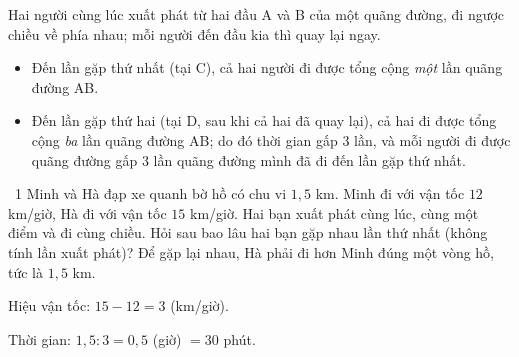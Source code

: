 \gap
{}
\begin{knowbox}
Hai người cùng lúc xuất phát từ hai đầu A và B của một quãng đường, đi ngược chiều về phía nhau; mỗi người đến đầu kia thì quay lại ngay.
\begin{center}
\end{center}
\begin{itemize}[leftmargin=1.4em,itemsep=3pt]
\item Đến lần gặp thứ nhất (tại C), cả hai người đi được tổng cộng \emph{một} lần quãng đường AB.
\item Đến lần gặp thứ hai (tại D, sau khi cả hai đã quay lại), cả hai đi được tổng cộng \emph{ba} lần quãng đường AB; do đó thời gian gấp $3$ lần, và mỗi người đi được quãng đường gấp $3$ lần quãng đường mình đã đi đến lần gặp thứ nhất.
\end{itemize}
\end{knowbox}
\gap
\begin{exbox}{\ExWord\ 1}
Minh và Hà đạp xe quanh bờ hồ có chu vi $1{,}5$ km. Minh đi với vận tốc $12$ km/giờ, Hà đi với vận tốc $15$ km/giờ. Hai bạn xuất phát cùng lúc, cùng một điểm và đi cùng chiều. Hỏi sau bao lâu hai bạn gặp nhau lần thứ nhất (không tính lần xuất phát)?
\guide
Để gặp lại nhau, Hà phải đi hơn Minh đúng một vòng hồ, tức là $1{,}5$ km.\par
Hiệu vận tốc: $15-12=3$ (km/giờ).\par
Thời gian: $1{,}5:3=0{,}5$ (giờ) $=30$ phút.
\end{exbox}
\gap
